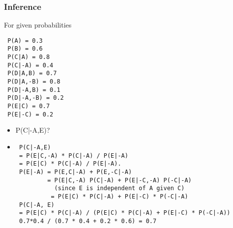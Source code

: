 \documentclass[compress, 9pt]{beamer}
\begin{document}
\begin{frame}[fragile]
\frametitle{Inference}
\label{sec-4-2}

For given probabilities
\begin{verbatim}
 P(A) = 0.3
 P(B) = 0.6
 P(C|A) = 0.8
 P(C|-A) = 0.4
 P(D|A,B) = 0.7
 P(D|A,-B) = 0.8
 P(D|-A,B) = 0.1
 P(D|-A,-B) = 0.2
 P(E|C) = 0.7
 P(E|-C) = 0.2
\end{verbatim}
\begin{itemize}

\item P(C|-A,E)?
\label{sec-4-2-1}%

\item <2->
\label{sec-4-2-2}%
\begin{verbatim}
 P(C|-A,E) 
 = P(E|C,-A) * P(C|-A) / P(E|-A) 
 = P(E|C) * P(C|-A) / P(E|-A).
 P(E|-A) = P(E,C|-A) + P(E,-C|-A) 
         = P(E|C,-A) P(C|-A) + P(E|-C,-A) P(-C|-A) 
           (since E is independent of A given C)
          = P(E|C) * P(C|-A) + P(E|-C) * P(-C|-A)
 P(C|-A, E) 
 = P(E|C) * P(C|-A) / (P(E|C) * P(C|-A) + P(E|-C) * P(-C|-A)) 
 0.7*0.4 / (0.7 * 0.4 + 0.2 * 0.6) = 0.7
\end{verbatim}
\end{itemize} %
\end{frame}
\end{document}
